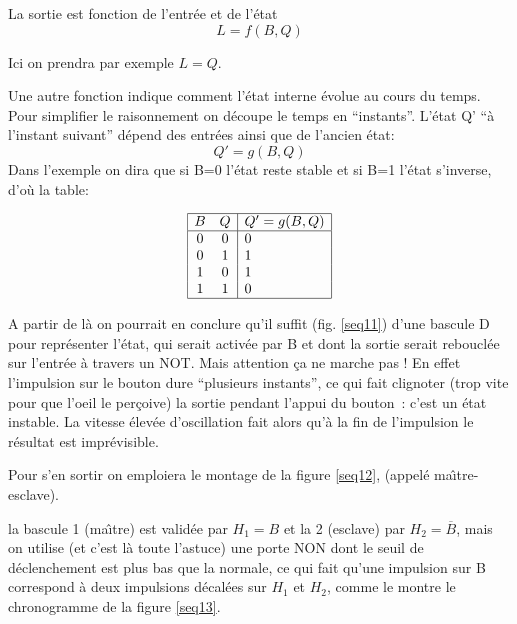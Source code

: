 La sortie est fonction de l'entr\'ee et de l'\'etat
	$$L = f( B , Q ) $$

Ici on prendra par exemple $L=Q$.

Une autre fonction indique comment l'\'etat interne \'evolue au cours du temps. 
Pour simplifier le raisonnement on d\'ecoupe 
le temps en ``instants''. L'\'etat Q' ``\`a l'instant suivant'' d\'epend
des entr\'ees ainsi que de l'ancien \'etat:
$$
	Q' = g(B , Q)
$$
Dans l'exemple on dira que si B=0 l'\'etat reste stable et si
B=1 l'\'etat s'inverse, d'o\`u la table:

$$
\begin{array}{|cc|l|}
\hline
	B & Q &	Q'=g(B,Q) \\
\hline
	0 & 0 &	0 \\
	0 & 1 &	1 \\
	1 & 0 &	1 \\
	1 & 1 &	0 \\
\hline
\end{array}
$$

A partir de l\`a on pourrait en conclure qu'il suffit (fig. \ref{seq11})
 d'une bascule D
pour repr\'esenter l'\'etat, qui serait activ\'ee par B et 
dont la sortie serait reboucl\'ee sur l'entr\'ee
\`a travers un NOT.
Mais attention \c{c}a ne marche pas !  En effet l'impulsion sur le
bouton dure ``plusieurs instants'', ce qui fait clignoter (trop vite
pour que l'oeil le perçoive) la sortie pendant l'appui du bouton~:
c'est un \'etat instable. La vitesse élevée d'oscillation fait alors
qu'à la fin de l'impulsion le résultat est imprévisible.
	 

Pour s'en sortir on emploiera le montage de la figure \ref{seq12},
(appel\'e ma\^{\i}tre-esclave).



la bascule 1 (ma\^{\i}tre) est valid\'ee par $H_1=B$ et la 2 (esclave) 
par $H_2=\overline{B}$, mais on utilise
(et c'est l\`a toute l'astuce) une porte NON dont le seuil 
de d\'eclenchement est plus bas
que la normale, ce qui fait qu'une impulsion sur B correspond \`a deux
impulsions d\'ecal\'ees sur $H_1$ et $H_2$, comme le montre le
chronogramme de la figure \ref{seq13}.
% 


